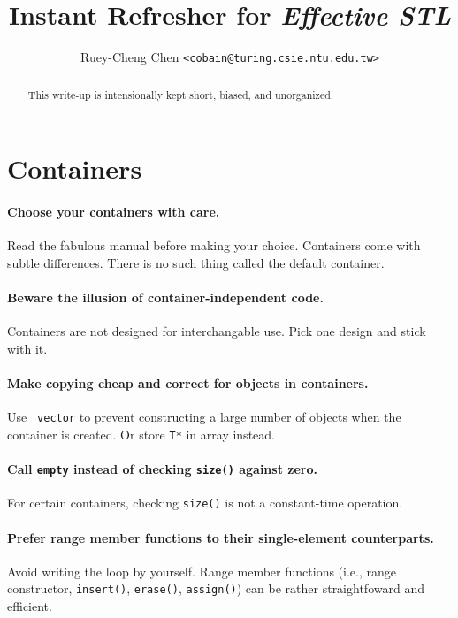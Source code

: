 \documentclass{article}
\begin{document}
\author{Ruey-Cheng Chen {\tt <cobain@turing.csie.ntu.edu.tw>}}
\title{Instant Refresher for {\it Effective STL}}
\maketitle

\begin{abstract}
This write-up is intensionally kept short, biased, and unorganized.
\end{abstract}

\section{Containers}

\paragraph{Choose your containers with care.}  Read the fabulous manual before
making your choice.  Containers come with subtle differences.  There is no such
thing called the default container.

\paragraph{Beware the illusion of container-independent code.} Containers are
not designed for interchangable use.  Pick one design and stick with it.

\paragraph{Make copying cheap and correct for objects in containers.} Use {\tt
vector} to prevent constructing a large number of objects
when the container is created.  Or store {\tt T*} in array instead.

\paragraph{Call {\tt empty} instead of checking {\tt size()} against zero.} For
certain containers, checking {\tt size()} is not a constant-time operation.

\paragraph{Prefer range member functions to their single-element counterparts.}
Avoid writing the loop by yourself.  Range member functions (i.e., range
constructor, {\tt insert()}, {\tt erase()}, {\tt assign()}) can be rather
straightfoward and efficient.  
\end{document}
